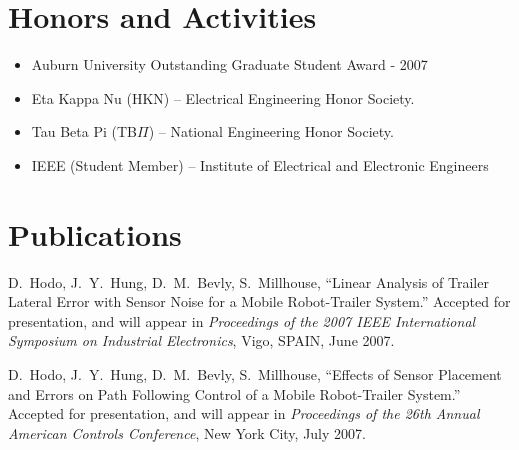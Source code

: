 \begin{resume}
\section{\sc Honors and Activities}
\begin{itemize}
	\item Auburn University Outstanding Graduate Student Award - 2007
  \item Eta Kappa Nu (HKN) -- Electrical Engineering Honor Society.
  \item Tau Beta Pi (TB$\Pi$) -- National Engineering Honor Society.
  \item IEEE (Student Member) -- Institute of Electrical and Electronic Engineers
\end{itemize}

\section{\sc Publications}
D.~Hodo, J.~Y.~Hung, D.~M.~Bevly, S.~Millhouse, ``Linear Analysis of Trailer Lateral Error with Sensor Noise for a Mobile Robot-Trailer System.'' Accepted for presentation, and will appear in \emph{Proceedings of the 2007 IEEE International Symposium on Industrial Electronics}, Vigo, SPAIN, June 2007.

D.~Hodo, J.~Y.~Hung, D.~M.~Bevly, S.~Millhouse, ``Effects of Sensor Placement and Errors on Path Following Control of a Mobile Robot-Trailer System.'' Accepted for presentation, and will appear in \emph{Proceedings of the 26th Annual American Controls Conference}, New York City, July 2007.

\end{resume}


